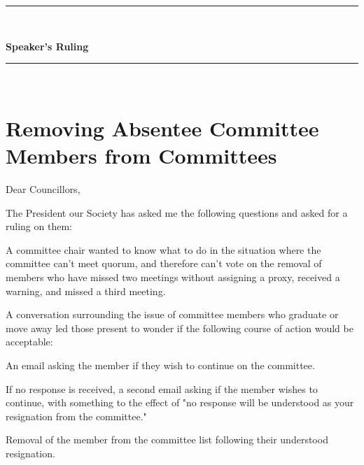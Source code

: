 
\begin{center}
\rule{\textwidth}{3.6pt}\\[\baselineskip] %
\begin{Huge}
\textbf{Speaker's Ruling}
\end{Huge}

\rule{\textwidth}{3.6pt}\\[\baselineskip] %



\vspace*{2\baselineskip} %
\end{center}
\section*{Removing Absentee Committee Members from Committees}

Dear Councillors,

The President our Society has asked me the following questions and asked for a ruling on them: 
\begin{longenum}[ label*=\arabic*., align=left]

\item A committee chair wanted to know what to do in the situation where the committee can't meet quorum, and therefore can't vote on the removal of members who have missed two meetings without assigning a proxy, received a warning, and missed a third meeting. 

\item A conversation surrounding the issue of committee members who graduate or move away led those present to wonder if the following course of action would be acceptable:
\begin{longenum}[ label*=\arabic*., align=left]
\item An email asking the member if they wish to continue on the committee.
\item If no response is received, a second email asking if the member wishes to continue, with something to the effect of "no response will be understood as your resignation from the committee."
\item Removal of the member from the committee list following their understood resignation.
\end{longenum}



\end{longenum}	

